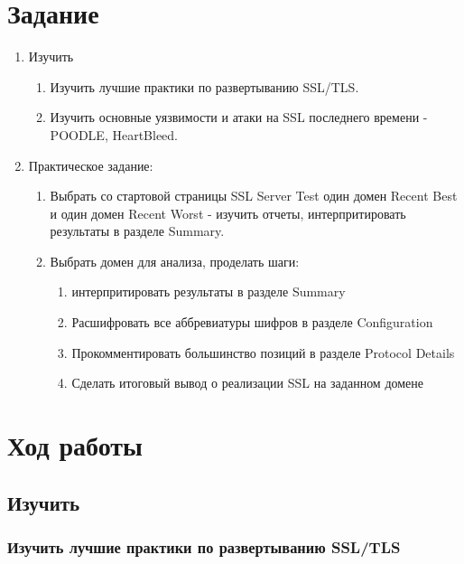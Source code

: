 \documentclass[10pt,a4paper,titlepage]{article}
\begin{document}
\tableofcontents
\newpage
\section{Задание}
\begin{enumerate}
	\item Изучить
	
\begin{enumerate}
\item Изучить лучшие практики по развертыванию SSL/TLS.
\item Изучить основные уязвимости и атаки на SSL последнего времени - POODLE, HeartBleed.
\end{enumerate}

    \item Практическое задание: 
    
\begin{enumerate}
    \item Выбрать со стартовой страницы SSL Server Test один домен Recent Best и один домен Recent Worst - изучить отчеты, интерпритировать результаты в разделе Summary.
   	\item Выбрать домен для анализа, проделать шаги: 
   	
   	\begin{enumerate}
    \item интерпритировать результаты в разделе Summary
    \item Расшифровать все аббревиатуры шифров в разделе Configuration
   	\item Прокомментировать большинство позиций в разделе Protocol Details
  	\item Сделать итоговый вывод о реализации SSL на заданном домене
\end{enumerate}

\end{enumerate}

\end{enumerate}

\section{Ход работы}
\subsection{Изучить}
\subsubsection{Изучить лучшие практики по развертыванию SSL/TLS}
\end{document}
